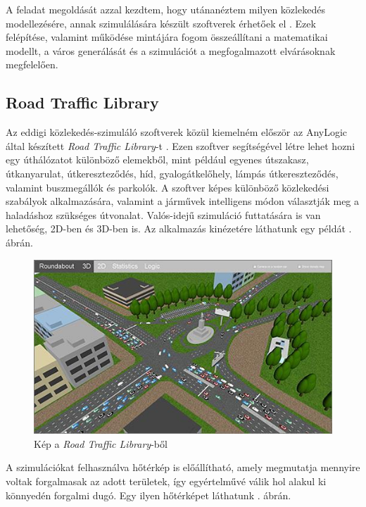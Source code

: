 

A feladat megoldását azzal kezdtem, hogy utánanéztem milyen közlekedés modellezésére, annak szimulálására készült szoftverek érhetőek el \cite{reviewoftrafficsim}. Ezek felépítése, valamint működése mintájára fogom összeállítani a matematikai modellt, a város generálását és a szimulációt a megfogalmazott elvárásoknak megfelelően.

\subsection{Road Traffic Library}

Az eddigi közlekedés-szimuláló szoftverek közül kiemelném először az AnyLogic által készített \textit{Road Traffic Library}-t \cite{roadtrafficsim}. Ezen szoftver segítségével létre lehet hozni egy úthálózatot
különböző elemekből, mint például egyenes útszakasz, útkanyarulat, útkereszteződés, híd, gyalogátkelőhely, lámpás útkereszteződés, valamint buszmegállók és parkolók.
A szoftver képes különböző közlekedési szabályok alkalmazására, valamint a járművek intelligens módon választják meg a haladáshoz szükséges útvonalat.
Valós-idejű szimuláció futtatására is van lehetőség, 2D-ben és 3D-ben is. Az alkalmazás kinézetére láthatunk egy példát . ábrán.

\begin{figure}[H]
\includegraphics[width=\linewidth]{RTL.png}
\caption{Kép a \textit{Road Traffic Library}-ből \cite{anylogicpic}}
\label{fig:RTL}
\end{figure}

A szimulációkat felhasználva hőtérkép is előállítható, amely megmutatja mennyire voltak
forgalmasak az adott területek, így egyértelművé válik hol alakul ki könnyedén forgalmi dugó. Egy ilyen hőtérképet láthatunk . ábrán.

